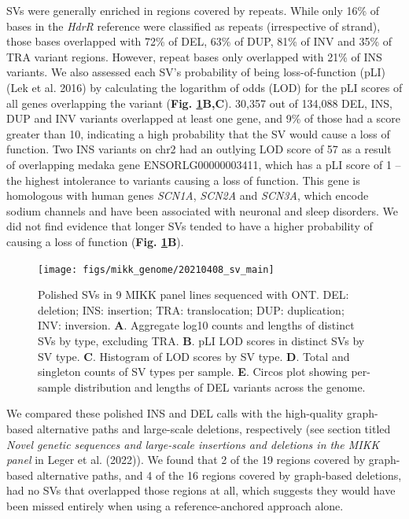 \documentclass[
]{book}
\begin{document}
SVs were generally enriched in regions covered by repeats. While only 16\% of bases in the \emph{HdrR} reference were classified as repeats (irrespective of strand), those bases overlapped with 72\% of DEL, 63\% of DUP, 81\% of INV and 35\% of TRA variant regions. However, repeat bases only overlapped with 21\% of INS variants. We also assessed each SV's probability of being loss-of-function (pLI)(Lek et al. 2016) by calculating the logarithm of odds (LOD) for the pLI scores of all genes overlapping the variant (\textbf{Fig. \ref{fig:SV-main}B,C}). 30,357 out of 134,088 DEL, INS, DUP and INV variants overlapped at least one gene, and 9\% of those had a score greater than 10, indicating a high probability that the SV would cause a loss of function. Two INS variants on chr2 had an outlying LOD score of 57 as a result of overlapping medaka gene ENSORLG00000003411, which has a pLI score of 1 -- the highest intolerance to variants causing a loss of function. This gene is homologous with human genes \emph{SCN1A}, \emph{SCN2A} and \emph{SCN3A}, which encode sodium channels and have been associated with neuronal and sleep disorders. We did not find evidence that longer SVs tended to have a higher probability of causing a loss of function (\textbf{Fig. \ref{fig:SV-main}B}).



\begin{figure}
\texttt{[image: figs/mikk\_genome/20210408\_sv\_main]} \caption{Polished SVs in 9 MIKK panel lines sequenced with ONT. DEL: deletion; INS: insertion; TRA: translocation; DUP: duplication; INV: inversion. \textbf{A}. Aggregate log10 counts and lengths of distinct SVs by type, excluding TRA. \textbf{B}. pLI LOD scores in distinct SVs by SV type. \textbf{C}. Histogram of LOD scores by SV type. \textbf{D}. Total and singleton counts of SV types per sample. \textbf{E}. Circos plot showing per-sample distribution and lengths of DEL variants across the genome.}\label{fig:SV-main}
\end{figure}

We compared these polished INS and DEL calls with the high-quality graph-based alternative paths and large-scale deletions, respectively (see section titled \emph{Novel genetic sequences and large-scale insertions and deletions in the MIKK panel} in Leger et al. (2022)). We found that 2 of the 19 regions covered by graph-based alternative paths, and 4 of the 16 regions covered by graph-based deletions, had no SVs that overlapped those regions at all, which suggests they would have been missed entirely when using a reference-anchored approach alone.
\end{document}
